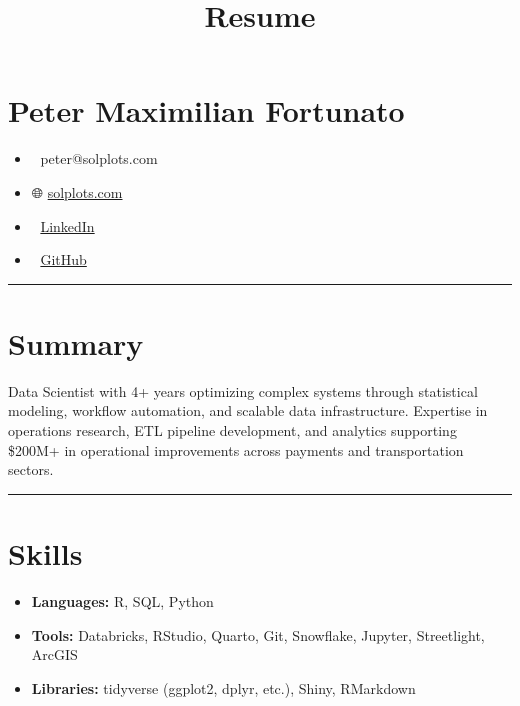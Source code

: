 \documentclass[
  11pt,
]{article}
\title{Resume}
\author{}
\date{}
\providecommand{\tightlist}{%
  \setlength{\itemsep}{0pt}\setlength{\parskip}{0pt}}\usepackage{longtable,booktabs,array}
\begin{document}
\maketitle
\hypertarget{peter-maximilian-fortunato}{%
\section{Peter Maximilian Fortunato}\label{peter-maximilian-fortunato}}

\begin{itemize}
\tightlist
\item
  📧 peter@solplots.com\\
\item
  🌐 \href{https://www.solplots.com}{solplots.com}\\
\item
  💼 \href{https://www.linkedin.com/in/peter-m-f/}{LinkedIn}\\
\item
  🐙 \href{https://github.com/gira-solo}{GitHub}
\end{itemize}

\begin{center}\rule{0.5\linewidth}{0.5pt}\end{center}

\hypertarget{summary}{%
\section{Summary}\label{summary}}

Data Scientist with 4+ years optimizing complex systems through
statistical modeling, workflow automation, and scalable data
infrastructure. Expertise in operations research, ETL pipeline
development, and analytics supporting \$200M+ in operational
improvements across payments and transportation sectors.

\begin{center}\rule{0.5\linewidth}{0.5pt}\end{center}

\hypertarget{skills}{%
\section{Skills}\label{skills}}

\begin{itemize}
\tightlist
\item
  \textbf{Languages:} R, SQL, Python
\item
  \textbf{Tools:} Databricks, RStudio, Quarto, Git, Snowflake, Jupyter,
  Streetlight, ArcGIS
\item
  \textbf{Libraries:} tidyverse (ggplot2, dplyr, etc.), Shiny, RMarkdown
\end{itemize}
\end{document}
